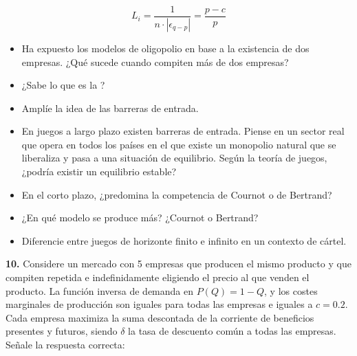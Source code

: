 \documentclass{nuevotema}
\begin{document}
\begin{equation*}
	L_i = \frac{1}{n \cdot \left| \epsilon_{q-p} \right|} = \frac{p - c}{p}
\end{equation*}



\preguntas


\begin{itemize}
    \item Ha expuesto los modelos de oligopolio en base a la existencia de dos empresas. ¿Qué sucede cuando compiten más de dos empresas?
    \item ¿Sabe lo que es la ?
    \item Amplíe la idea de las barreras de entrada.
    \item En juegos a largo plazo existen barreras de entrada. Piense en un sector real que opera en todos los países en el que existe un monopolio natural que se liberaliza y pasa a una situación de equilibrio. Según la teoría de juegos, ¿podría existir un equilibrio estable?
    \item En el corto plazo, ¿predomina la competencia de Cournot o de Bertrand?
    \item ¿En qué modelo se produce más? ¿Cournot o Bertrand?
    \item Diferencie entre juegos de horizonte finito e infinito en un contexto de cártel.
\end{itemize}


\textbf{10.} Considere un mercado con 5 empresas que producen el mismo producto y que compiten repetida e indefinidamente eligiendo el precio al que venden el producto. La función inversa de demanda en $P(Q) = 1 -Q$, y los costes marginales de producción son iguales para todas las empresas e iguales a $c=0.2$. Cada empresa maximiza la suma descontada de la corriente de beneficios presentes y futuros, siendo $\delta$ la tasa de descuento común a todas las empresas. Señale la respuesta correcta:
\end{document}
